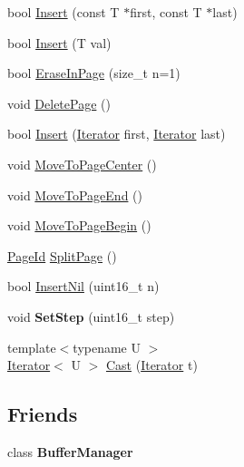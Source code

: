 \begin{DoxyCompactItemize}
\item 
bool \mbox{\hyperlink{class_buffer_manager_1_1_iterator_a7a42be8229dace561a4e71f80ab406f2}{Insert}} (const T $\ast$first, const T $\ast$last)
\item 
bool \mbox{\hyperlink{class_buffer_manager_1_1_iterator_ae24c9a89811caf17cc6d6970c2953038}{Insert}} (T val)
\item 
bool \mbox{\hyperlink{class_buffer_manager_1_1_iterator_a2c627998f19999fe55b7452b840ce47b}{Erase\+In\+Page}} (size\+\_\+t n=1)
\item 
void \mbox{\hyperlink{class_buffer_manager_1_1_iterator_a2e9a59db2ef1289b16469750e422edd5}{Delete\+Page}} ()
\item 
bool \mbox{\hyperlink{class_buffer_manager_1_1_iterator_ad977beaab2295e8d8e3cedd7ff555a4d}{Insert}} (\mbox{\hyperlink{class_buffer_manager_1_1_iterator}{Iterator}} first, \mbox{\hyperlink{class_buffer_manager_1_1_iterator}{Iterator}} last)
\item 
void \mbox{\hyperlink{class_buffer_manager_1_1_iterator_a20b703d6135c5e3026eab944a32ca186}{Move\+To\+Page\+Center}} ()
\item 
void \mbox{\hyperlink{class_buffer_manager_1_1_iterator_a88ae36356076d25c8959ecfbaa084d9f}{Move\+To\+Page\+End}} ()
\item 
void \mbox{\hyperlink{class_buffer_manager_1_1_iterator_a5fcb5fb10746e3d58736959a12610dd0}{Move\+To\+Page\+Begin}} ()
\item 
\mbox{\hyperlink{struct_generic_i_o_id}{Page\+Id}} \mbox{\hyperlink{class_buffer_manager_1_1_iterator_a18f31d37240c5a587a85042374c5272d}{Split\+Page}} ()
\item 
bool \mbox{\hyperlink{class_buffer_manager_1_1_iterator_aee5637c96ddb7c5fef0f9a12d133c7c8}{Insert\+Nil}} (uint16\+\_\+t n)
\item 
\mbox{\label{class_buffer_manager_1_1_iterator_a1591dc4282b5129d722ea483b1f44f34}} 
void {\bfseries Set\+Step} (uint16\+\_\+t step)
\item 
{\footnotesize template$<$typename U $>$ }\\\mbox{\hyperlink{class_buffer_manager_1_1_iterator}{Iterator}}$<$ U $>$ \mbox{\hyperlink{class_buffer_manager_1_1_iterator_aac3b1b6e41babe5e82814e69e040fd20}{Cast}} (\mbox{\hyperlink{class_buffer_manager_1_1_iterator}{Iterator}} t)
\end{DoxyCompactItemize}
\subsection*{Friends}
\begin{DoxyCompactItemize}
\item 
\mbox{\label{class_buffer_manager_1_1_iterator_a16155b1414091f690eefe4f5292199dc}} 
class {\bfseries Buffer\+Manager}
\end{DoxyCompactItemize}


